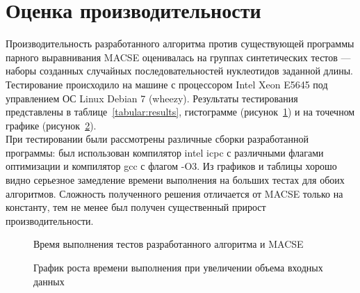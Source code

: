 \newpage



\section[Оценка производительности]{\large \centering Оценка производительности}
\hspace{\parindent} Производительность разработанного алгоритма против существующей программы парного выравнивания MACSE оценивалась на группах синтетических тестов --- наборы созданных случайных последовательностей нуклеотидов заданной длины. Тестирование происходило на машине с процессором Intel Xeon E5645 под управлением ОС Linux Debian 7 (wheezy). Результаты тестирования представлены в таблице~\ref{tabular:results}, гистограмме (рисунок~\ref{ris:gist}) и на точечном графике (рисунок~\ref{ris:3D}).\\
\indent При тестировании были рассмотрены различные сборки разработанной программы: был использован компилятор intel icpc с различными флагами оптимизации и компилятор gcc с флагом -O3. Из графиков и таблицы хорошо видно серьезное замедление времени выполнения на больших тестах для обоих алгоритмов. Сложность полученного решения отличается от MACSE только на константу, тем не менее был получен существенный прирост производительности.

\begin{figure}[h]
	\caption{Время выполнения тестов разработанного алгоритма и MACSE}
	\label{ris:gist}
\end{figure}
\begin{figure}[h]
	\caption{График роста времени выполнения при увеличении объема входных данных}
	\label{ris:3D}
\end{figure}

